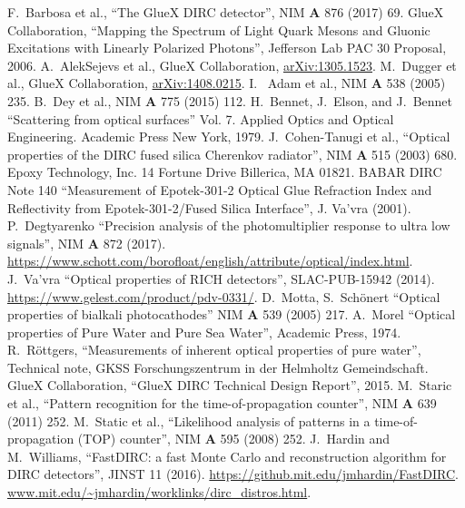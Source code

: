 \documentclass[11pt, a4paper]{article}
\begin{document}
\begin{thebibliography}{1}
 F.~Barbosa et al., ``The GlueX DIRC detector'', NIM \textbf{A} 876 (2017) 69.
 GlueX Collaboration, ``Mapping the Spectrum of Light Quark Mesons and Gluonic Excitations with Linearly Polarized Photons'', Jefferson Lab PAC 30 Proposal, 2006.
 A.~AlekSejevs et al., GlueX Collaboration, \url{arXiv:1305.1523}.
 M.~Dugger et al., GlueX Collaboration, \url{arXiv:1408.0215}. 
 I.~ Adam et al., NIM \textbf{A} 538 (2005) 235.
 B.~Dey et al., NIM \textbf{A} 775 (2015) 112.
 H.~Bennet, J.~Elson, and J.~Bennet ``Scattering from optical surfaces'' Vol. 7. Applied Optics and Optical Engineering. Academic Press New York, 1979.
 J.~Cohen-Tanugi et al., ``Optical properties of the DIRC fused silica Cherenkov radiator'', NIM \textbf{A} 515 (2003) 680. 
 Epoxy Technology, Inc. 14 Fortune Drive Billerica, MA 01821.
 BABAR DIRC Note 140 ``Measurement of Epotek-301-2 Optical Glue Refraction Index and Reflectivity from Epotek-301-2/Fused Silica Interface'', J. Va'vra (2001).
 P.~Degtyarenko ``Precision analysis of the photomultiplier response to ultra low signals'', NIM \textbf{A} 872 (2017).
\url{https://www.schott.com/borofloat/english/attribute/optical/index.html}.
 J.~Va'vra ``Optical properties of RICH detectors'', SLAC-PUB-15942 (2014).
\url{https://www.gelest.com/product/pdv-0331/}.
 D.~Motta, S.~Sch{\"o}nert ``Optical properties of bialkali photocathodes'' NIM \textbf{A} 539 (2005) 217. 
 A.~Morel ``Optical properties of Pure Water and Pure Sea Water'', Academic Press, 1974.
 R.~R{\"o}ttgers, ``Measurements of inherent optical properties of pure water'', Technical note, GKSS Forschungszentrum in der Helmholtz Gemeindschaft.
 GlueX Collaboration, ``GlueX DIRC Technical Design Report'', 2015.
 M.~Staric et al., ``Pattern recognition for the time-of-propagation counter'', NIM \textbf{A} 639 (2011) 252.
 M.~Static et al., ``Likelihood analysis of patterns in a time-of-propagation (TOP) counter'', NIM \textbf{A} 595 (2008) 252.
 J.~Hardin and M.~Williams, ``FastDIRC: a fast Monte Carlo and reconstruction algorithm for DIRC detectors'', JINST 11 (2016).
\url{https://github.mit.edu/jmhardin/FastDIRC}.
\url{www.mit.edu/~jmhardin/worklinks/dirc\_distros.html}.

\end{thebibliography}
\end{document}
